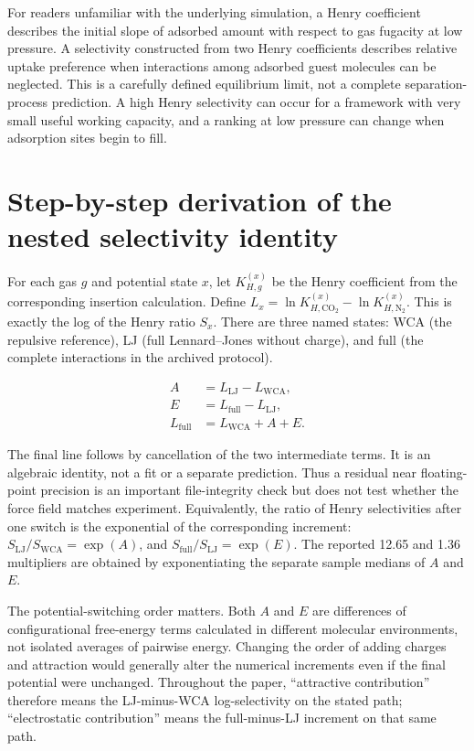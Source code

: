 \documentclass[11pt,a4paper]{article}
\begin{document}
For readers unfamiliar with the underlying simulation, a Henry coefficient describes the initial slope of adsorbed amount with respect to gas fugacity at low pressure. A selectivity constructed from two Henry coefficients describes relative uptake preference when interactions among adsorbed guest molecules can be neglected. This is a carefully defined equilibrium limit, not a complete separation-process prediction. A high Henry selectivity can occur for a framework with very small useful working capacity, and a ranking at low pressure can change when adsorption sites begin to fill.

\section{Step-by-step derivation of the nested selectivity identity}

For each gas $g$ and potential state $x$, let $K_{H,g}^{(x)}$ be the Henry coefficient from the corresponding insertion calculation. Define $L_x=\ln K_{H,\mathrm{CO_2}}^{(x)}-\ln K_{H,\mathrm{N_2}}^{(x)}$. This is exactly the log of the Henry ratio $S_x$. There are three named states: WCA (the repulsive reference), LJ (full Lennard--Jones without charge), and full (the complete interactions in the archived protocol).

\begin{align}
A &= L_{\mathrm{LJ}}-L_{\mathrm{WCA}},\\
E &= L_{\mathrm{full}}-L_{\mathrm{LJ}},\\
L_{\mathrm{full}} &=L_{\mathrm{WCA}}+A+E.
\end{align}

The final line follows by cancellation of the two intermediate terms. It is an algebraic identity, not a fit or a separate prediction. Thus a residual near floating-point precision is an important file-integrity check but does not test whether the force field matches experiment. Equivalently, the ratio of Henry selectivities after one switch is the exponential of the corresponding increment: $S_{\mathrm{LJ}}/S_{\mathrm{WCA}}=\exp(A)$, and $S_{\mathrm{full}}/S_{\mathrm{LJ}}=\exp(E)$. The reported 12.65 and 1.36 multipliers are obtained by exponentiating the separate sample medians of $A$ and $E$.

The potential-switching order matters. Both $A$ and $E$ are differences of configurational free-energy terms calculated in different molecular environments, not isolated averages of pairwise energy. Changing the order of adding charges and attraction would generally alter the numerical increments even if the final potential were unchanged. Throughout the paper, ``attractive contribution'' therefore means the LJ-minus-WCA log-selectivity on the stated path; ``electrostatic contribution'' means the full-minus-LJ increment on that same path.
\end{document}
